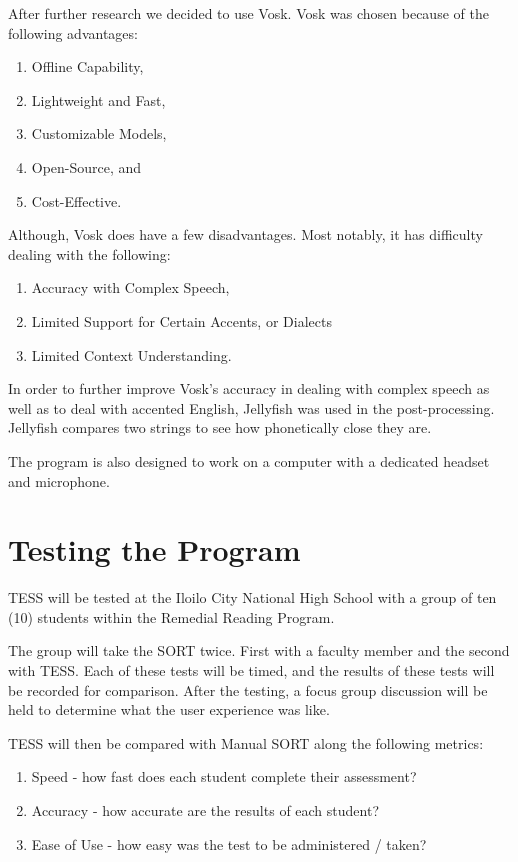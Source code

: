 After further research we decided to use Vosk. Vosk was chosen because of the following advantages:
\begin{enumerate}
\item Offline Capability,
\item Lightweight and Fast,
\item Customizable Models,
\item Open-Source, and 
\item Cost-Effective.
\end{enumerate}

Although, Vosk does have a few disadvantages. Most notably, it has difficulty dealing with the following:
\begin{enumerate}
    \item Accuracy with Complex Speech,
    \item Limited Support for Certain Accents, or Dialects
    \item Limited Context Understanding.
\end{enumerate}

In order to further improve Vosk’s accuracy in dealing with complex speech as well as to deal with accented English, Jellyfish was used in the post-processing. Jellyfish compares two strings to see how phonetically close they are.

The program is also designed to work on a computer with a dedicated headset and microphone.
\section{Testing the Program}
TESS will be tested at the Iloilo City National High School with a group of ten (10) students within the Remedial Reading Program.

The group will take the SORT twice. First with a faculty member and the second with TESS. Each of these tests will be timed, and the results of these tests will be recorded for comparison.
After the testing, a focus group discussion will be held to determine what the user experience was like.

TESS will then be compared with Manual SORT along the following metrics:
\begin{enumerate}
\item Speed - how fast does each student complete their assessment?
\item Accuracy - how accurate are the results of each student?
\item Ease of Use - how easy was the test to be administered / taken?
\end{enumerate}

